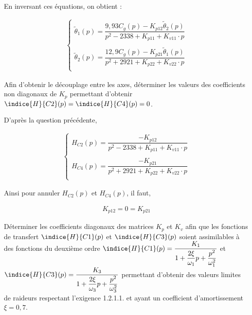 \documentclass[11pt]{article}
\begin{document}
\begin{UPSTIcorrige}
En inversant ces équations, on obtient : 

\begin{align*}
\left\{
\begin{array}{l}
\tilde{\theta}_1(p)=\dfrac{9,93C_g(p)-K_{p12}\tilde{\theta}_2(p)}{p^2-2338+K_{p11}+K_{v11}\cdot p}\\
\\
\tilde{\theta}_2(p)=\dfrac{12,9C_g(p)-K_{p21}\tilde{\theta}_1(p)}{p^2+2921+K_{p22}+K_{v22}\cdot p}\\
\end{array}
\right.
\end{align*}

\end{UPSTIcorrige}


\UPSTIquestion Afin d’obtenir le découplage entre les axes, déterminer les valeurs des coefficients non diagonaux de
$K_p$ permettant d’obtenir $\indice{H}{C2}(p)=\indice{H}{C4}(p)=0$.

\begin{UPSTIcorrige}

D'après la question précédente,

\begin{align*}
\left\{
\begin{array}{l}
H_{C2}(p)=\dfrac{-K_{p12}}{p^2-2338+K_{p11}+K_{v11}\cdot p}\\
\\
H_{C4}(p)=\dfrac{-K_{p21}}{p^2+2921+K_{p22}+K_{v22}\cdot p}\\
\end{array}
\right.
\end{align*}

Ainsi pour annuler $H_{C2}(p)$ et $H_{C4}(p)$, il faut,

\begin{align*}
K_{p12}=0=K_{p21}
\end{align*}

\end{UPSTIcorrige}

\UPSTIquestion Déterminer les coefficients diagonaux des matrices $K_p$ et $K_v$ afin que les fonctions de transfert $\indice{H}{C1}(p)$ et $\indice{H}{C3}(p)$ soient assimilables à des fonctions du deuxième ordre $\indice{H}{C1}(p) = \dfrac{K_1}{1+\dfrac{2\xi}{\omega_1}p + \dfrac{p^2}{\omega_1^2}}$
et $\indice{H}{C3}(p) = \dfrac{K_3}{1+\dfrac{2\xi}{\omega_3}p + \dfrac{p^2}{\omega_3^2}}$ permettant d’obtenir des valeurs limites de raideurs respectant l’exigence 1.2.1.1. et ayant
un coefficient d’amortissement $\xi=0,7$.
\end{document}
